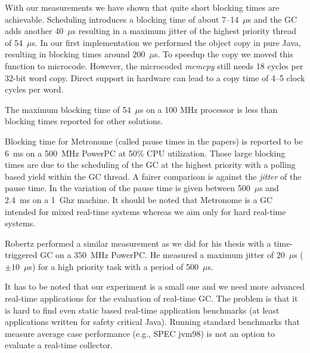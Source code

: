With our measurements we have shown that quite short blocking times
are achievable. Scheduling introduces a blocking time of about
7--14~$\mu$s and the GC adds another 40~$\mu$s resulting in a
maximum jitter of the highest priority thread of 54~$\mu$s. In our
first implementation we performed the object copy in pure Java,
resulting in blocking times around 200~$\mu$s. To speedup the copy
we moved this function to microcode. However, the microcoded
\emph{memcpy} still needs 18 cycles per 32-bit word copy. Direct
support in hardware can lead to a copy time of 4--5 clock cycles per
word.


The maximum blocking time of 54~$\mu$s on a 100 MHz processor is less than
blocking times reported for other solutions.

Blocking time for Metronome (called pause times in the papers) is
reported to be 6~ms \cite{gc:jtres:metronome} on a 500~MHz PowerPC
at 50\% CPU utilization. Those large blocking times are due to the
scheduling of the GC at the highest priority with a polling based
yield within the GC thread. A fairer comparison is against the
\emph{jitter} of the pause time. In \cite{gc:bacon05} the variation
of the pause time is given between 500~$\mu$s and 2.4~ms on a 1~Ghz
machine. It should be noted that Metronome is a GC intended for
mixed real-time systems whereas we aim only for hard real-time
systems.

Robertz performed a similar measurement as we did for his thesis
\cite{gc:robertz:thesis} with a time-triggered GC on a 350~MHz
PowerPC. He measured a maximum jitter of 20~$\mu$s ($\pm10$~$\mu$s)
for a high priority task with a period of 500~$\mu$s.

It has to be noted that our experiment is a small one and we need
more advanced real-time applications for the evaluation of real-time
GC. The problem is that it is hard to find even static based
real-time application benchmarks (at least applications written for
safety critical Java). Running standard benchmarks that measure
average case performance (e.g., SPEC jvm98) is not an option to
evaluate a real-time collector.



